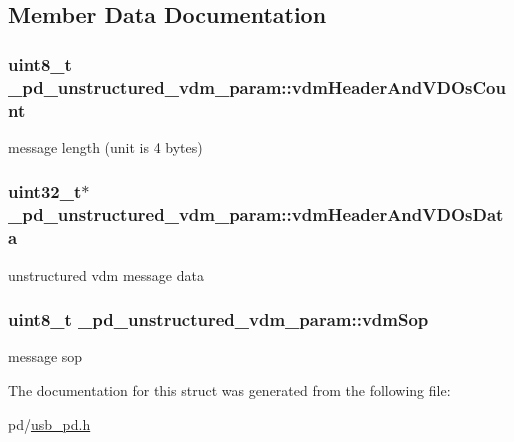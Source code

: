 \subsection{Member Data Documentation}
\hypertarget{struct__pd__unstructured__vdm__param_a7efceddd48daf429c447c7c7108c9066}{
\subsubsection[{vdm\-Header\-And\-V\-D\-Os\-Count}]{\setlength{\rightskip}{0pt plus 5cm}uint8\-\_\-t \-\_\-pd\-\_\-unstructured\-\_\-vdm\-\_\-param\-::vdm\-Header\-And\-V\-D\-Os\-Count}}\label{struct__pd__unstructured__vdm__param_a7efceddd48daf429c447c7c7108c9066}
message length (unit is 4 bytes) \hypertarget{struct__pd__unstructured__vdm__param_ace459022833c093044261a805aca67ac}{
\subsubsection[{vdm\-Header\-And\-V\-D\-Os\-Data}]{\setlength{\rightskip}{0pt plus 5cm}uint32\-\_\-t$\ast$ \-\_\-pd\-\_\-unstructured\-\_\-vdm\-\_\-param\-::vdm\-Header\-And\-V\-D\-Os\-Data}}\label{struct__pd__unstructured__vdm__param_ace459022833c093044261a805aca67ac}
unstructured vdm message data \hypertarget{struct__pd__unstructured__vdm__param_a842d85782a56f40375590061c9e2003c}{
\subsubsection[{vdm\-Sop}]{\setlength{\rightskip}{0pt plus 5cm}uint8\-\_\-t \-\_\-pd\-\_\-unstructured\-\_\-vdm\-\_\-param\-::vdm\-Sop}}\label{struct__pd__unstructured__vdm__param_a842d85782a56f40375590061c9e2003c}
message sop 

The documentation for this struct was generated from the following file\-:\begin{DoxyCompactItemize}
\item 
pd/\hyperlink{usb__pd_8h}{usb\-\_\-pd.\-h}\end{DoxyCompactItemize}
